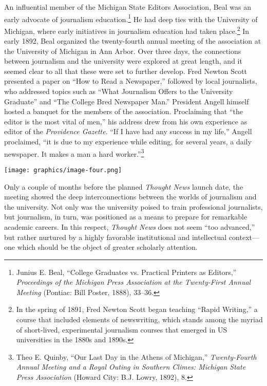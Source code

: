 \documentclass[openany,nobib]{tufte-book}
\begin{document}
An influential member of the Michigan State Editors Association, Beal
was an early advocate of journalism education.\footnote{Junius E. Beal,
  ``College Graduates vs. Practical Printers as Editors,''
  \emph{Proceedings of the Michigan Press Association at the
  Twenty-First Annual Meeting} (Pontiac: Bill Poster, 1888), 33--36.} He
had deep ties with the University of Michigan, where early initiatives
in journalism education had taken place.\footnote{In the spring of 1891,
  Fred Newton Scott began teaching ``Rapid Writing,'' a course that
  included elements of newswriting, which stands among the myriad of
  short-lived, experimental journalism courses that emerged in US
  universities in the 1880s and 1890s.} In early 1892, Beal organized
the twenty-fourth annual meeting of the association at the University of
Michigan in Ann Arbor. Over three days, the connections between
journalism and the university were explored at great length, and it
seemed clear to all that these were set to further develop. Fred Newton
Scott presented a paper on ``How to Read a Newspaper,'' followed by
local journalists, who addressed topics such as ``What Journalism Offers
to the University Graduate'' and ``The College Bred Newspaper Man.''
President Angell himself hosted a banquet for the members of the
association. Proclaiming that ``the editor is the most vital of men,''
his address drew from his own experience as editor of the
\emph{Providence Gazette}. ``If I have had any success in my life,''
Angell proclaimed, ``it is due to my experience while editing, for
several years, a daily newspaper. It makes a man a hard
worker.''\footnote{Theo E. Quinby, ``Our Last Day in the Athens of
  Michigan,'' \emph{Twenty-Fourth Annual Meeting and a Royal Outing in
  Southern Climes: Michigan State Press Association} (Howard City: B.J.
  Lowry, 1892), 8.}

\begin{figure*}
   \texttt{[image: graphics/image-four.png]}
   \label{fig:fig4}
\end{figure*}


Only a couple of months before the planned \emph{Thought News} launch
date, the meeting showed the deep interconnections between the worlds of
journalism and the university. Not only was the university poised to
train professional journalists, but journalism, in turn, was positioned
as a means to prepare for remarkable academic careers. In this respect,
\emph{Thought News} does not seem ``too advanced,'' but rather nurtured
by a highly favorable institutional and intellectual context---one which
should be the object of greater scholarly attention.
\end{document}
